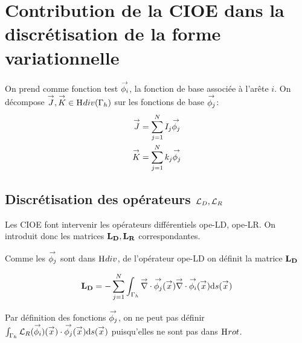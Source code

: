 
\section{Contribution de la CIOE dans la discrétisation de la forme variationnelle}


  On prend comme fonction test \(\phii\), la fonction de base associée à l'arête \(i\).
  On décompose \(\vJ,\vK \in \Hdiv(\Gamma_h)\) sur les fonctions de base \(\phij\):
    \begin{align*}
      \vJ & = \sum_{j=1}^N I_j \phij\\
      \vK & = \sum_{j=1}^N k_j \phij
    \end{align*}

  \subsection[Discrétisation des opérateurs LD, LR]{Discrétisation des opérateurs \(\LD,\LR\)}
    Les CIOE font intervenir les opérateurs différentiels \gls{ope-LD}, \gls{ope-LR}. On introduit donc les matrices \(\mLD,\mLR\) correspondantes.

    Comme les \(\phij\) sont dans \(\Hdiv\), de l'opérateur \gls{ope-LD} on définit la matrice \(\mLD\)
    \begin{defn}
      \begin{align*}
          \mLD = - \sum_{j=1}^N \int_{\Gamma_h} \vdiv \phij(\vx) \vdiv \phii(\vx) \dd{s}(\vx)
      \end{align*}
    \end{defn}
    Par définition des fonctions \(\phij\), on ne peut pas définir \( \int_{\Gamma_h} \LR(\phii)(\vx) \cdot \phij(\vx) \dd{s}(\vx)\) puisqu'elles ne sont pas dans \(\Hrot\).

